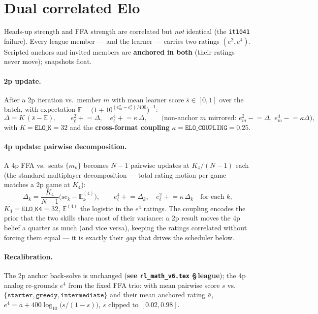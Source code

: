 \documentclass[11pt]{article}
\newcommand{\E}{\mathbb{E}}
\newcommand{\cd}[1]{\texttt{#1}}
\newcommand{\vsixref}[1]{\textbf{see \texttt{rl\_math\_v6.tex} \S\,#1}}
\begin{document}
\section{Dual correlated Elo}\label{v9:elo}
Heads-up strength and FFA strength are correlated but \emph{not} identical (the \cd{it1041}
failure). Every league member --- and the learner --- carries two ratings $(e^{2}, e^{4})$.
Scripted anchors and invited members are \textbf{anchored in both} (their ratings never move);
snapshots float.

\paragraph{2p update.} After a 2p iteration vs.\ member $m$ with mean learner score
$\bar s\in[0,1]$ over the batch, with expectation
$\E=\big(1+10^{(e^2_m-e^2_\ell)/400}\big)^{-1}$:
\begin{equation}
\Delta=K\,(\bar s-\E),\qquad
e^2_\ell \mathrel{+}= \Delta,\quad e^4_\ell \mathrel{+}= \kappa\,\Delta,\qquad
\text{(non-anchor $m$ mirrored: } e^2_m\mathrel{-}=\Delta,\ e^4_m\mathrel{-}=\kappa\Delta\text{)},
\end{equation}
with $K=\cd{ELO\_K}=32$ and the \textbf{cross-format coupling} $\kappa=\cd{ELO\_COUPLING}=0.25$.

\paragraph{4p update: pairwise decomposition.} A 4p FFA vs.\ seats $\{m_k\}$ becomes
$N{-}1$ pairwise updates at $K_4/(N{-}1)$ each (the standard multiplayer decomposition --- total
rating motion per game matches a 2p game at $K_4$):
\begin{equation}
\Delta_k=\frac{K_4}{N-1}\big(\mathrm{sc}_k-\E_k^{(4)}\big),\qquad
e^4_\ell\mathrel{+}=\Delta_k,\quad e^2_\ell\mathrel{+}=\kappa\,\Delta_k\quad\text{for each }k,
\end{equation}
$K_4=\cd{ELO\_K4}=32$, $\E^{(4)}$ the logistic in the $e^4$ ratings. The coupling encodes the
prior that the two skills share most of their variance: a 2p result moves the 4p belief a quarter
as much (and vice versa), keeping the ratings correlated without forcing them equal --- it is
exactly their \emph{gap} that drives the scheduler below.

\paragraph{Recalibration.} The 2p anchor back-solve is unchanged (\vsixref{league}); the 4p analog
re-grounds $e^4$ from the fixed FFA trio: with mean pairwise score $s$ vs.\
$\{\cd{starter},\cd{greedy},\cd{intermediate}\}$ and their mean anchored rating $\bar a$,
$e^4=\bar a+400\log_{10}\!\big(s/(1{-}s)\big)$, $s$ clipped to $[0.02,0.98]$.
\end{document}
